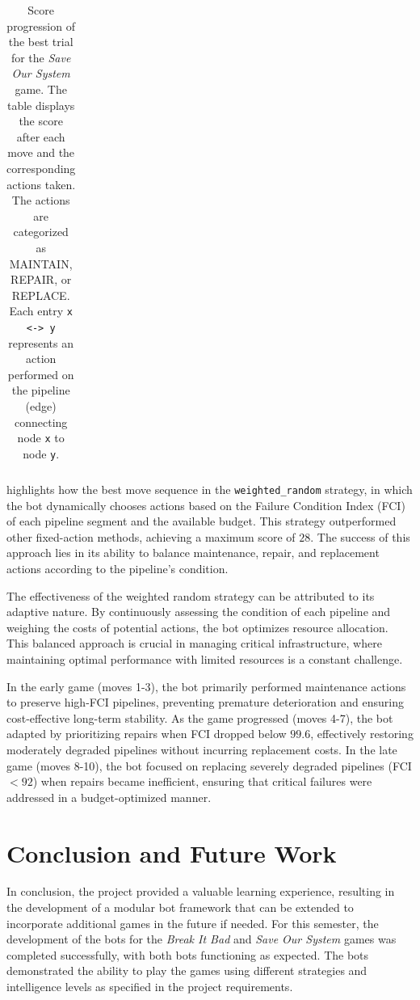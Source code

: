 \documentclass[12pt,a4paper]{report}
\begin{document}
\begin{table}[h!]
\begin{tabular}{ccp{12cm}}
            \bottomrule
            \end{tabular}
            \caption{Score progression of the best trial for the \textit{Save Our System} game. The table displays the score after each move and the corresponding actions taken. The actions are categorized as MAINTAIN, REPAIR, or REPLACE. Each entry \texttt{x <-> y} represents an action performed on the pipeline (edge) connecting node \texttt{x} to node \texttt{y}.}
            \label{tab:score-progression}
        \end{table}

         highlights how the best move sequence in the \texttt{weighted\_random} strategy, in which the bot dynamically chooses actions based on the Failure Condition Index (FCI) of each pipeline segment and the available budget. This strategy outperformed other fixed-action methods, achieving a maximum score of $28$. The success of this approach lies in its ability to balance maintenance, repair, and replacement actions according to the pipeline’s condition.

        The effectiveness of the weighted random strategy can be attributed to its adaptive nature. By continuously assessing the condition of each pipeline and weighing the costs of potential actions, the bot optimizes resource allocation. This balanced approach is crucial in managing critical infrastructure, where maintaining optimal performance with limited resources is a constant challenge.

        In the early game (moves 1-3), the bot primarily performed maintenance actions to preserve high-FCI pipelines, preventing premature deterioration and ensuring cost-effective long-term stability. As the game progressed (moves 4-7), the bot adapted by prioritizing repairs when FCI dropped below $99.6$, effectively restoring moderately degraded pipelines without incurring replacement costs. In the late game (moves 8-10), the bot focused on replacing severely degraded pipelines (FCI $< 92$) when repairs became inefficient, ensuring that critical failures were addressed in a budget-optimized manner.

    \chapter{Conclusion and Future Work}
    \label{chap:conclusion-future-work}
        
        In conclusion, the project provided a valuable learning experience, resulting in the development of a modular bot framework that can be extended to incorporate additional games in the future if needed. For this semester, the development of the bots for the \textit{Break It Bad} and \textit{Save Our System} games was completed successfully, with both bots functioning as expected. The bots demonstrated the ability to play the games using different strategies and intelligence levels as specified in the project requirements.
        
\end{document}
